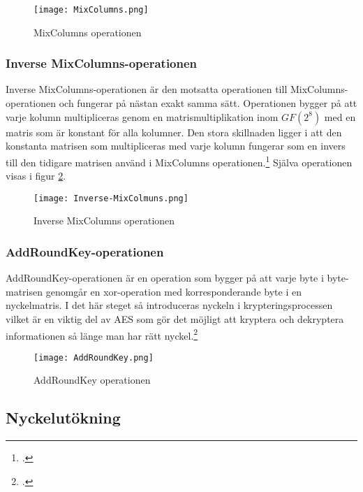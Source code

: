 \begin{figure}[H]
    \centering
    \texttt{[image: MixColumns.png]}
    \caption{MixColumns operationen}
    \label{fig:aes-mixcolumns-pic}
\end{figure}

\subsubsection{Inverse MixColumns-operationen}
\label{sec:aes-invers-mixcolumns}

Inverse MixColumns-operationen är den motsatta operationen till MixColumns-operationen och fungerar på nästan exakt samma sätt. Operationen bygger på att varje kolumn multipliceras genom en
matrismultiplikation inom \hyperref[sec:finite-fields]{$GF(2^8)$} med en matris som är konstant för alla kolumner. Den stora skillnaden ligger i att den konstanta matrisen som multipliceras med varje kolumn fungerar
som en invers till den tidigare matrisen använd i MixColumns operationen.\footcite{daemen1999aes} Själva operationen visas i figur \ref{fig:aes-inverse-mixcolumns-pic}.

\begin{figure}[H]
    \centering
    \texttt{[image: Inverse-MixColmuns.png]}
    \caption{Inverse MixColumns operationen}
    \label{fig:aes-inverse-mixcolumns-pic}
\end{figure}

\subsubsection{AddRoundKey-operationen}
\label{sec:aes-addroundkey}

AddRoundKey-operationen är en operation som bygger på att varje \gls{byte} i \gls{byte}-matrisen genomgår en \gls{xor}-operation med korresponderande \gls{byte} i en nyckelmatris.
I det här steget så introduceras nyckeln i krypteringsprocessen vilket är en viktig del av AES som gör det möjligt att kryptera och dekryptera informationen så länge man har rätt nyckel.\footcite{daemen1999aes}

\begin{figure}[H]
    \centering
    \texttt{[image: AddRoundKey.png]}
    \caption{AddRoundKey operationen}
    \label{fig:aes-addroundkey-pic}
\end{figure}

\pagebreak
\subsection{Nyckelutökning}
\label{sec:aes-key-expansion}


